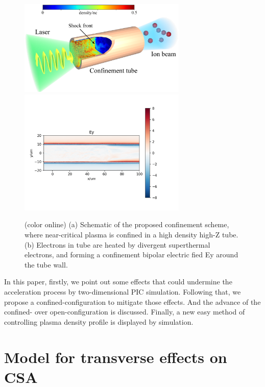 \documentclass[12pt]{iopart}
\begin{document}
\begin{figure}
    \includegraphics[width=8cm]{sketch.eps}\label{fig:sketch}
    \includegraphics[width=8cm]{confine_ey.png} \label{fig:confine_ey}
    \caption{(color online) (a) Schematic of the proposed confinement scheme, where near-critical plasma is confined in a high density high-Z tube. (b) Electrons in tube are heated by divergent superthermal electrons, and forming a confinement bipolar electric fied Ey around the tube wall.}
\end{figure}

In this paper, firstly, we point out some effects that could undermine the acceleration process by two-dimensional PIC simulation. Following that, we propose a confined-configuration to mitigate those effects. And the advance of the confined- over open-configuration is discussed. Finally, a new easy method of controlling plasma density profile is displayed by simulation. 
 
\section{Model for transverse effects on CSA}
\label{theory}
 
\end{document}
